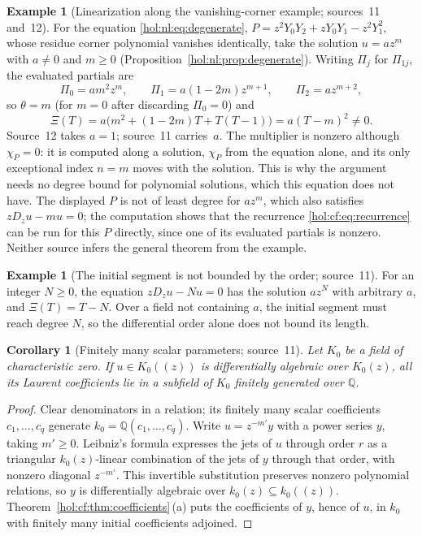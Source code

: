 \documentclass[11pt]{article}
\numberwithin{equation}{section}
\newtheorem{corollary}[theorem]{Corollary}
\theoremstyle{definition}
\newtheorem{example}[theorem]{Example}
\theoremstyle{remark}
\newcommand{\Q}{\mathbb Q}
\begin{document}
\begin{example}[Linearization along the vanishing-corner example; sources~11
and~12]\label{hol:cf:ex:corner}
For the equation \eqref{hol:nl:eq:degenerate},
$P=z^2Y_0Y_2+zY_0Y_1-z^2Y_1^2$, whose residue corner polynomial vanishes
identically, take the solution $u=az^m$ with $a\ne0$ and $m\ge0$
(Proposition~\ref{hol:nl:prop:degenerate}). Writing $\Pi_j$ for $\Pi_{1j}$, the
evaluated partials are
\[
 \Pi_0=am^2z^m,\qquad\Pi_1=a(1-2m)z^{m+1},\qquad\Pi_2=az^{m+2},
\]
so $\theta=m$ (for $m=0$ after discarding $\Pi_0=0$) and
\begin{equation}\label{hol:cf:eq:eulermultiplier}
 \Xi(T)=a\bigl(m^2+(1-2m)T+T(T-1)\bigr)=a(T-m)^2\ne0.
\end{equation}
Source~12 takes $a=1$; source~11 carries~$a$. The multiplier is nonzero although
$\chi_P=0$: it is computed along a solution, $\chi_P$ from the equation
alone, and its only exceptional index $n=m$ moves with the solution. This is
why the argument needs no degree bound for polynomial solutions, which this
equation does not have. The displayed $P$ is not of least degree for $az^m$,
which also satisfies $zD_zu-mu=0$; the computation shows that the recurrence
\eqref{hol:cf:eq:recurrence} can be run for this $P$ directly, since one of its
evaluated partials is nonzero. Neither source infers the general theorem from
the example.
\end{example}

\begin{example}[The initial segment is not bounded by the order; source~11]
For an integer $N\ge0$, the equation $zD_zu-Nu=0$ has the solution $az^N$ with
arbitrary $a$, and $\Xi(T)=T-N$. Over a field not containing $a$, the initial
segment must reach degree $N$, so the differential order alone does not bound
its length.
\end{example}

\begin{corollary}[Finitely many scalar parameters; source~11]
\label{hol:cf:cor:finitegen}
Let $K_0$ be a field of characteristic zero.
If $u\in K_0((z))$ is differentially algebraic over $K_0(z)$, all its Laurent
coefficients lie in a subfield of $K_0$ finitely generated over $\Q$.
\end{corollary}

\begin{proof}
Clear denominators in a relation; its finitely many scalar coefficients
$c_1,\ldots,c_q$ generate $k_0=\Q(c_1,\ldots,c_q)$. Write $u=z^{-m'}y$ with a
power series $y$, taking $m'\ge0$. Leibniz's formula expresses the jets of
$u$ through order $r$ as a triangular $k_0(z)$-linear combination of the
jets of $y$ through that order, with nonzero diagonal $z^{-m'}$.
This invertible substitution preserves nonzero polynomial relations, so
$y$ is differentially algebraic over $k_0(z)\subseteq k_0((z))$. Theorem~\ref{hol:cf:thm:coefficients}\,(a)
puts the coefficients of $y$, hence of $u$, in $k_0$ with finitely many
initial coefficients adjoined.
\end{proof}
\end{document}
